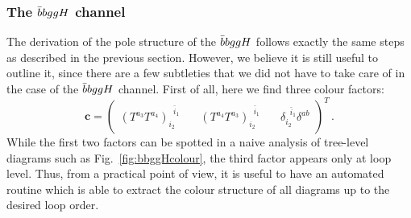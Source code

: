 \documentclass[main.tex]{subfiles}
\begin{document}
\subsubsection{The $\bar{b}bggH$ channel}
The derivation of the pole structure of the $\bar{b}bggH$ follows exactly the same steps as described in the previous section. However, we believe it is still useful to outline it, since there are a few subtleties that we did not have to take care of in the case of the $\bar{b}bggH$ channel. First of all, here we find three colour factors:
\begin{equation}
    \bm{c} = 
    \begin{pmatrix}
        (T^{a_3}T^{a_4})_{i_2}^{\;\;\bar{i}_1} & \quad (T^{a_4}T^{a_3})_{i_2}^{\;\;\bar{i}_1}
        & \quad \delta_{i_2}^{\;\;\bar{i}_1} \delta^{ab}
    \end{pmatrix}^T\,.
\end{equation}
While the first two factors can be spotted in a naive analysis of tree-level diagrams such as Fig.~\ref{fig:bbggHcolour}, the third factor appears only at loop level. Thus, from a practical point of view, it is useful to have an automated routine which is able to extract the colour structure of all diagrams up to the desired loop order.
\end{document}

